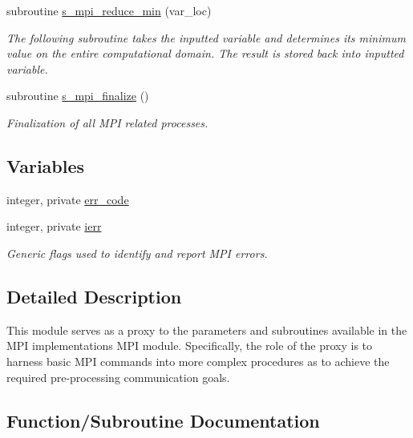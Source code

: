 \begin{DoxyCompactItemize}
subroutine \hyperlink{namespacem__mpi__proxy_ad02d11c9b94b9354f7d8234937bb27a2}{s\+\_\+mpi\+\_\+reduce\+\_\+min} (var\+\_\+loc)
\begin{DoxyCompactList}\small\item\em The following subroutine takes the inputted variable and determines its minimum value on the entire computational domain. The result is stored back into inputted variable. \end{DoxyCompactList}\item 
subroutine \hyperlink{namespacem__mpi__proxy_a43fbda10c02ec8bc1fc572c83090f2e5}{s\+\_\+mpi\+\_\+finalize} ()
\begin{DoxyCompactList}\small\item\em Finalization of all M\+PI related processes. \end{DoxyCompactList}\end{DoxyCompactItemize}
\subsection*{Variables}
\begin{DoxyCompactItemize}
\item 
integer, private \hyperlink{namespacem__mpi__proxy_ae5709407e3600d19d79b183e409bb982}{err\+\_\+code}
\item 
integer, private \hyperlink{namespacem__mpi__proxy_a306ba163b09cfc692125f2c0ba82ef8c}{ierr}
\begin{DoxyCompactList}\small\item\em Generic flags used to identify and report M\+PI errors. \end{DoxyCompactList}\end{DoxyCompactItemize}


\subsection{Detailed Description}
This module serves as a proxy to the parameters and subroutines available in the M\+PI implementation\textquotesingle{}s M\+PI module. Specifically, the role of the proxy is to harness basic M\+PI commands into more complex procedures as to achieve the required pre-\/processing communication goals. 

\subsection{Function/\+Subroutine Documentation}
\mbox{\label{namespacem__mpi__proxy_a2ff35ede51e90c483969e44c31303415}} 

